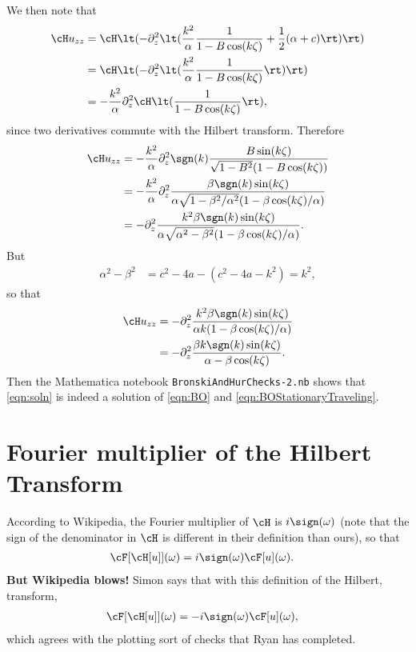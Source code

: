 \documentclass[a4paper,10pt]{article}
\begin{document}
We then note that
\begin{align}
  \cH u_{zz} &= \cH\lt( -\partial_z^2 \lt(\frac{k^2}{\alpha}
  \frac{1}{1-B\cos(k\zeta)} + \frac12(\alpha +c)\rt)\rt)\\
  &= \cH\lt(- \partial_z^2 \lt(\frac{k^2}{\alpha}
  \frac{1}{1-B\cos(k\zeta)}\rt) \rt)\\
  &=-\frac{k^2}{\alpha} \partial_z^2 \cH\lt( 
  \frac{1}{1-B\cos(k\zeta)}\rt),
\end{align}
since two derivatives commute with the Hilbert transform. Therefore
\begin{align}
  \cH u_{zz} &= -\frac{k^2}{\alpha}\partial_z^2 \sgn(k) \frac{B
  \sin(k\zeta)}{\sqrt{1-B^2}(1-B \cos(k\zeta))}\\
  &= -\frac{k^2}{\alpha} \partial_z^2 \frac{ \beta \sgn(k)\sin(k\zeta)}{\alpha
  \sqrt{1-\beta^2/\alpha^2}(1-\beta \cos(k\zeta)/\alpha)}\\
  &= -\partial_z^2 \frac{k^2 \beta \sgn(k)\sin(k\zeta)}{\alpha\sqrt{\alpha^2-\beta^2}(1-\beta
  \cos(k\zeta)/\alpha)}.
\end{align}
But 
\begin{align}
  \alpha^2 -\beta^2 &= c^2 -4a - (c^2-4a-k^2) = k^2,
\end{align}
so that
\begin{align}
    \cH u_{zz} &= -\partial_z^2 \frac{k^2 \beta \sgn(k)\sin(k\zeta)}{\alpha
    k(1-\beta \cos(k\zeta)/\alpha)}\\
    &= -\partial_z^2 \frac{\beta k \sgn(k)\sin(k\zeta)}{\alpha - \beta \cos(k\zeta)}.
\end{align}
Then the Mathematica notebook \verb+BronskiAndHurChecks-2.nb+ shows that
\eqref{eqn:soln} is indeed a solution of \eqref{eqn:BO} and
\eqref{eqn:BOStationaryTraveling}.


\section{Fourier multiplier of the Hilbert Transform}
According to Wikipedia, the Fourier multiplier of $\cH$ is $i\sign(\omega)$
(note that the sign of the denominator in $\cH$ is different in their definition
than ours), so that
\begin{align}
  \cF[ \cH[u]](\omega) &= i\sign(\omega) \cF[u](\omega).
\end{align}
\textbf{But Wikipedia blows!} Simon says that with this definition of the
Hilbert, transform, 
\begin{align}
  \cF[ \cH[u]](\omega) &= -i\sign(\omega)\cF[u](\omega),
\end{align}
which agrees with the plotting sort of checks that Ryan has completed.
\end{document}
